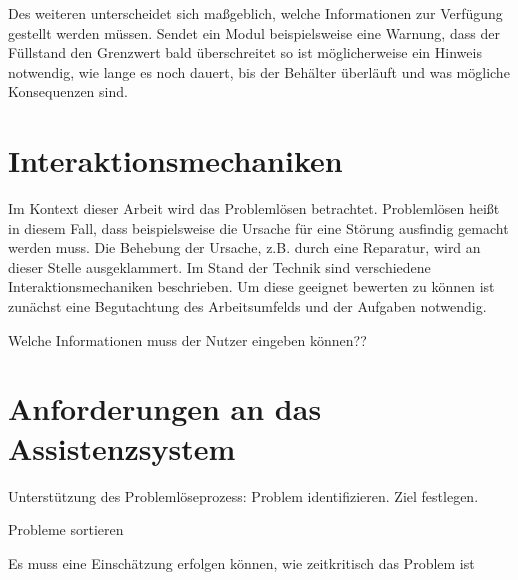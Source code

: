Des weiteren unterscheidet sich maßgeblich, welche Informationen zur Verfügung gestellt werden müssen. Sendet ein Modul beispielsweise eine Warnung, dass der Füllstand den Grenzwert bald überschreitet so ist möglicherweise ein Hinweis notwendig, wie lange es noch dauert, bis der Behälter überläuft und was mögliche Konsequenzen sind. 

\section{Interaktionsmechaniken}
Im Kontext dieser Arbeit wird das Problemlösen betrachtet. Problemlösen heißt in diesem Fall, dass beispielsweise die Ursache für eine Störung ausfindig gemacht werden muss. Die Behebung der Ursache, z.B. durch eine Reparatur, wird an dieser Stelle ausgeklammert. Im Stand der Technik sind verschiedene Interaktionsmechaniken beschrieben. Um diese geeignet bewerten zu können ist zunächst eine Begutachtung des Arbeitsumfelds und der Aufgaben notwendig. 

Welche Informationen muss der Nutzer eingeben können??

\section{Anforderungen an das Assistenzsystem}

Unterstützung des Problemlöseprozess: Problem identifizieren. Ziel festlegen.

Probleme sortieren

Es muss eine Einschätzung erfolgen können, wie zeitkritisch das Problem ist


